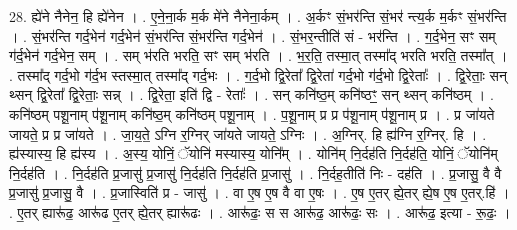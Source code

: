 \documentclass[17pt]{extarticle}
\begin{document}
28. ह्ये॑ने नैनेन॒ हि ह्ये॑नेन । . ए॒ने॒ना॒र्क म॒र्क मे॑ने नैनेना॒र्कम् । . अ॒र्कꣳ सं॒भर॑न्ति सं॒भर॑ न्त्य॒र्क म॒र्कꣳ सं॒भर॑न्ति । . सं॒भर॑न्ति गर्द॒भेन॑ गर्द॒भेन॑ सं॒भर॑न्ति सं॒भर॑न्ति गर्द॒भेन॑ । . सं॒भर॒न्तीति॑ सं - भर॑न्ति । . ग॒र्द॒भेन॒ सꣳ सम् ग॑र्द॒भेन॑ गर्द॒भेन॒ सम् । . सम् भ॑रति भरति॒ सꣳ सम् भ॑रति । . भ॒र॒ति॒ तस्मा॒त् तस्मा᳚द् भरति भरति॒ तस्मा᳚त् । . तस्मा᳚द् गर्द॒भो ग॑र्द॒भ स्तस्मा॒त् तस्मा᳚द् गर्द॒भः । . ग॒र्द॒भो द्वि॒रेता᳚ द्वि॒रेता॑ गर्द॒भो ग॑र्द॒भो द्वि॒रेताः᳚ । . द्वि॒रेताः॒ सन् थ्सन् द्वि॒रेता᳚ द्वि॒रेताः॒ सन्न् । . द्वि॒रेता॒ इति॑ द्वि - रेताः᳚ । . सन् कनि॑ष्ठ॒म् कनि॑ष्ठꣳ॒॒ सन् थ्सन् कनि॑ष्ठम् । . कनि॑ष्ठम् पशू॒नाम् प॑शू॒नाम् कनि॑ष्ठ॒म् कनि॑ष्ठम् पशू॒नाम् । . प॒शू॒नाम् प्र प्र प॑शू॒नाम् प॑शू॒नाम् प्र । . प्र जा॑यते जायते॒ प्र प्र जा॑यते । . जा॒य॒ते॒ ऽग्नि र॒ग्निर् जा॑यते जायते॒ ऽग्निः । . अ॒ग्निर्. हि ह्य॑ग्नि र॒ग्निर्. हि । . ह्य॑स्यास्य॒ हि ह्य॑स्य । . अ॒स्य॒ योनिं॒ ॅयोनि॑ मस्यास्य॒ योनि᳚म् । . योनि॑म् नि॒र्दह॑ति नि॒र्दह॑ति॒ योनिं॒ ॅयोनि॑म् नि॒र्दह॑ति । . नि॒र्दह॑ति प्र॒जासु॑ प्र॒जासु॑ नि॒र्दह॑ति नि॒र्दह॑ति प्र॒जासु॑ । . नि॒र्दह॒तीति॑ निः - दह॑ति । . प्र॒जासु॒ वै वै प्र॒जासु॑ प्र॒जासु॒ वै । . प्र॒जास्विति॑ प्र - जासु॑ । . वा ए॒ष ए॒ष वै वा ए॒षः । . ए॒ष ए॒तर् ह्ये॒तर् ह्ये॒ष ए॒ष ए॒तर्.हि॑ । . ए॒तर् ह्यारू॑ढ॒ आरू॑ढ ए॒तर् ह्ये॒तर् ह्यारू॑ढः । . आरू॑ढः॒ स स आरू॑ढ॒ आरू॑ढः॒ सः । . आरू॑ढ॒ इत्या - रू॒ढः॒ । \newline
\end{document}

